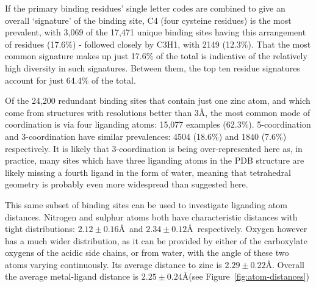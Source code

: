 If the primary binding residues' single letter codes are combined to give an overall `signature' of the binding site, C4 (four cysteine residues) is the most prevalent, with 3,069 of the 17,471 unique binding sites having this arrangement of residues (17.6\%) - followed closely by C3H1, with 2149 (12.3\%). That the most common signature makes up just 17.6\% of the total is indicative of the relatively high diversity in such signatures. Between them, the top ten residue signatures account for just 64.4\% of the total.

Of the 24,200 redundant binding sites that contain just one zinc atom, and which come from structures with resolutions better than 3\AA, the most common mode of coordination is via four liganding atoms: 15,077 examples (62.3\%). 5-coordination and 3-coordination have similar prevalences: 4504 (18.6\%) and 1840 (7.6\%) respectively. It is likely that 3-coordination is being over-represented here as, in practice, many sites which have three liganding atoms in the PDB structure are likely missing a fourth ligand in the form of water, meaning that tetrahedral geometry is probably even more widespread than suggested here.

This same subset of binding sites can be used to investigate liganding atom distances. Nitrogen and sulphur atoms both have characteristic distances with tight distributions: $2.12\pm0.16$\AA\ and $2.34\pm0.12$\AA\ respectively. Oxygen however has a much wider distribution, as it can be provided by either of the carboxylate oxygens of the acidic side chains, or from water, with the angle of these two atoms varying continuously. Its average distance to zinc is $2.29\pm0.22$\AA. Overall the average metal-ligand distance is $2.25\pm0.24$\AA (see Figure~\ref{fig:atom-distances})

